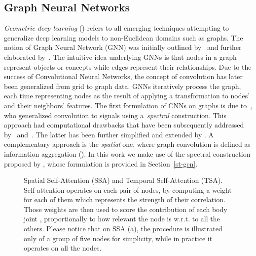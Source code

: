 \documentclass[times,twocolumn,final,authoryear]{elsarticle}
\begin{document}
\subsection{Graph Neural Networks} 
\textit{Geometric deep learning} (\cite{DBLP:journals/corr/BronsteinBLSV16}) refers to all emerging techniques attempting to generalize deep learning models to non-Euclidean domains such as graphs. The notion of Graph Neural Network (GNN) was initially outlined by~\cite{Gori2005ANM} and further elaborated by~\cite{Scarselli2009TheGN}. The intuitive idea underlying GNNs is that nodes in a graph represent objects or concepts while edges represent their relationships. Due to the success of Convolutional Neural Networks, the concept of convolution has later been generalized from grid to graph data. GNNs iteratively process the graph, each time representing nodes as the result of applying a transformation to nodes' and their neighbors' features. The first formulation of CNNs on graphs is due to~\cite{ae482107de73461787258f805cf8f4ed}, who generalized convolution to signals using a~\textit{spectral} construction. This approach had computational drawbacks that have been subsequently addressed by~\cite{DBLP:journals/corr/HenaffBL15} and~\cite{DBLP:journals/corr/DefferrardBV16}. The latter has been further simpliﬁed and extended by \cite{Kipf:2016tc}. A complementary approach is the \textit{spatial} one, where graph convolution is defined as information aggregation (\cite{article7,DBLP:journals/corr/NiepertAK16,DBLP:journals/corr/SuchSDPZMCP17}). In this work we make use of the spectral construction proposed by \cite{Kipf:2016tc}, whose formulation is provided in Section~\ref{st-gcn}.
\begin{figure*}[t]
\centering
{}
\hspace{1cm}
\caption{{Spatial Self-Attention (SSA)} and {Temporal Self-Attention (TSA)}. Self-attention operates on each pair of nodes, by computing a weight for each of them which represents the strength of their correlation. Those weights are then used to score the contribution of each body joint , proportionally to how relevant the node is w.r.t. to all the others. Please notice that on SSA (a), the procedure is illustrated only of a group of five nodes for simplicity, while in practice it operates on all the nodes.}
\label{SSA_TSA}
\end{figure*}
\end{document}
